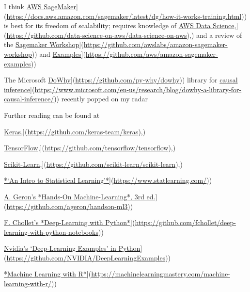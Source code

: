 \documentclass[
]{book}
\begin{document}
I think \href{\%5Bhttps://docs.aws.amazon.com/sagemaker/latest/dg/how-it-works-training.html}{AWS SageMaker}{]}(\url{https://docs.aws.amazon.com/sagemaker/latest/dg/how-it-works-training.html})) is best for its freedom of scalability; requires knowledge of \href{\%5Bhttps://github.com/data-science-on-aws/data-science-on-aws}{AWS Data Science},{]}(\url{https://github.com/data-science-on-aws/data-science-on-aws}),) and a review of the \href{\%5Bhttps://github.com/awslabs/amazon-sagemaker-workshop}{Sagemaker Workshop}{]}(\url{https://github.com/awslabs/amazon-sagemaker-workshop})) and \href{\%5Bhttps://github.com/aws/amazon-sagemaker-examples}{Examples}{]}(\url{https://github.com/aws/amazon-sagemaker-examples}))

The Microsoft \href{\%5Bhttps://github.com/py-why/dowhy}{DoWhy}{]}(\url{https://github.com/py-why/dowhy})) library for \href{\%5Bhttps://www.microsoft.com/en-us/research/blog/dowhy-a-library-for-causal-inference/}{causal inference}{]}(\url{https://www.microsoft.com/en-us/research/blog/dowhy-a-library-for-causal-inference/})) recently popped on my radar

Further reading can be found at

\href{\%5Bhttps://github.com/keras-team/keras}{Keras},{]}(\url{https://github.com/keras-team/keras}),)

\href{\%5Bhttps://github.com/tensorflow/tensorflow}{TensorFlow},{]}(\url{https://github.com/tensorflow/tensorflow}),)

\href{\%5Bhttps://github.com/scikit-learn/scikit-learn}{Scikit-Learn},{]}(\url{https://github.com/scikit-learn/scikit-learn}),)

\href{\%5Bhttps://www.statlearning.com/}{*`An Intro to Statistical Learning'*}{]}(\url{https://www.statlearning.com/}))

\href{\%5Bhttps://github.com/ageron/handson-ml3}{A. Geron's *Hands-On Machine-Learning*, 3rd ed.}{]}(\url{https://github.com/ageron/handson-ml3}))

\href{\%5Bhttps://github.com/fchollet/deep-learning-with-python-notebooks}{F. Chollet's *Deep-Learning with Python*}{]}(\url{https://github.com/fchollet/deep-learning-with-python-notebooks}))

\href{\%5Bhttps://github.com/NVIDIA/DeepLearningExamples}{Nvidia's `Deep-Learning Examples' in Python}{]}(\url{https://github.com/NVIDIA/DeepLearningExamples}))

\href{\%5Bhttps://machinelearningmastery.com/machine-learning-with-r/}{*Machine Learning with R*}{]}(\url{https://machinelearningmastery.com/machine-learning-with-r/}))
\end{document}
